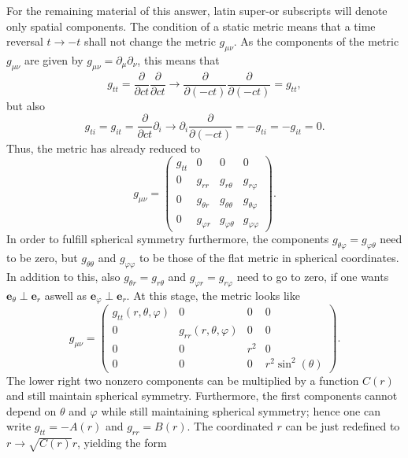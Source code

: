 \documentclass[a4paper,11pt]{article}
\numberwithin{equation}{section}
\newcommand\vect[1]{\ensuremath{\bm{#1}}}
\begin{document}
{For the remaining material of this answer, latin super-or subscripts will denote only spatial components. The condition of a static metric means that a time reversal $t \rightarrow -t$ shall not change the metric $g_{\mu\nu}$. As the components of the metric $g_{\mu\nu}$ are given by $g_{\mu\nu} = \partial_\mu\partial_\nu$, this means that \begin{equation}
	g_{tt} = \frac{\partial}{\partial c t} \frac{\partial}{\partial c t} \rightarrow \frac{\partial}{\partial (- c t)} \frac{\partial}{\partial (-c t)} = g_{tt},
\end{equation} but also \begin{equation}
g_{ti} = g_{it} =  \frac{\partial}{\partial c t}\partial_i \rightarrow \partial_i \frac{\partial}{\partial (-ct)} = -g_{ti} = -g_{it} = 0.
\end{equation} Thus, the metric has already reduced to \begin{equation}
g_{\mu\nu} = \begin{pmatrix}
	g_{tt} & 0 & 0 & 0 \\
	0 & g_{rr} & g_{r\theta} & g_{r\varphi} \\
	0 & g_{\theta r} & g_{\theta\theta} & g_{\theta\varphi} \\
	0 & g_{\varphi r} & g_{\varphi \theta} & g_{\varphi\varphi}
\end{pmatrix}.
\end{equation} In order to fulfill spherical symmetry furthermore, the components $g_{\theta\varphi} = g_{\varphi\theta}$ need to be zero, but $g_{\theta\theta}$ and $g_{\varphi\varphi}$ to be those of the flat metric in spherical coordinates. In addition to this, also $g_{\theta r} = g_{r\theta}$ and $g_{\varphi r} = g_{r\varphi}$ need to go to zero, if one wants $\vect{e}_\theta \perp \vect{e}_r$ aswell as $\vect{e}_\varphi \perp \vect{e}_r$. At this stage, the metric looks like \begin{equation}
g_{\mu\nu} = \begin{pmatrix}
	g_{tt}(r,\theta,\varphi) & 0 & 0 & 0\\
	0 & g_{rr}(r,\theta,\varphi) & 0 & 0 \\
0& 0 & r^2 & 0 \\
	0 & 0 & 0 &  r^2\sin^2(\theta)
\end{pmatrix}.
\end{equation} The lower right two nonzero components can be multiplied by a function $C(r)$ and still maintain spherical symmetry. Furthermore, the first components cannot depend on $\theta$ and $\varphi$ while still maintaining spherical symmetry; hence one can write $g_{tt} = -A(r)$ and $g_{rr} = B(r)$. The coordinated $r$ can be just redefined to $r \rightarrow  \sqrt{C(r)}r$, yielding the form
}
\end{document}
